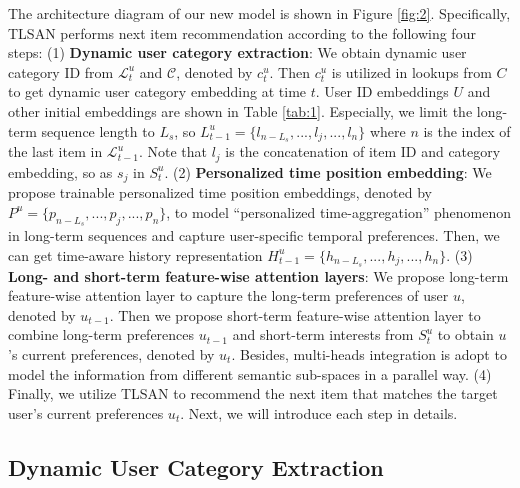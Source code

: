 \documentclass[preprint,12pt]{elsarticle}
\newcommand{\tool}{TLSAN\xspace}
\begin{document}
\begin{sloppypar}
The architecture diagram of our new model is shown in Figure \ref{fig:2}. Specifically, \tool performs next item recommendation according to the following four steps: (1) \textbf{Dynamic user category extraction}: We obtain dynamic user category ID from $\mathcal{L}^u_t$ and $\mathcal{C}$, denoted by $c^u_t$. Then $c^u_t$ is utilized in lookups from $C$ to get dynamic user category embedding at time $t$. User ID embeddings $U$ and other initial embeddings are shown in Table \ref{tab:1}. Especially, we limit the long-term sequence length to $L_s$, so $L^u_{t-1}=\{l_{n-L_s},...,l_j,...,l_n\}$ where $n$ is the index of the last item in $\mathcal{L}^u_{t-1}$. Note that $l_j$ is the concatenation of item ID and category embedding, so as $s_j$ in $S^u_t$. (2) \textbf{Personalized time position embedding}: We propose trainable personalized time position embeddings, denoted by $P^u=\{p_{n-L_s},...,p_j,...,p_n\}$, to model ``personalized time-aggregation'' phenomenon in long-term sequences and capture user-specific temporal preferences. Then, we can get time-aware history representation $H^u_{t-1}=\{h_{n-L_s},...,h_j,...,h_n\}$. (3) \textbf{Long- and short-term feature-wise attention layers}: We propose long-term feature-wise attention layer to capture the long-term preferences of user $u$, denoted by $u_{t-1}$. Then we propose short-term feature-wise attention layer to combine long-term preferences $u_{t-1}$ and short-term interests from $S^u_t$ to obtain $u$'s current preferences, denoted by $u_{t}$. Besides, multi-heads integration is adopt to model the information from different semantic sub-spaces in a parallel way. (4) Finally, we utilize \tool to recommend the next item that matches the target user's current preferences $u_{t}$. 
Next, we will introduce each step in details.


\subsection{Dynamic User Category Extraction}


\end{sloppypar}
\end{document}

